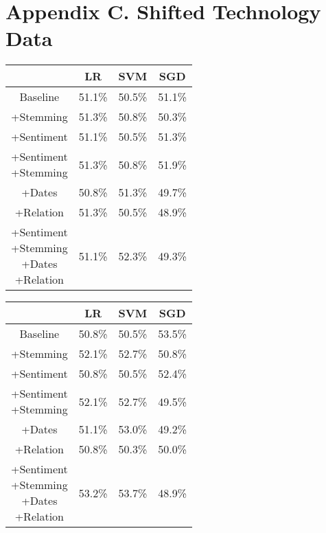 \documentclass[11pt,a4paper]{article}
\begin{document}
\section{Appendix C. Shifted Technology Data}
\begin{center}
\begin{tabular}{ |c|c|c|c| }
 \hline
  & LR & SVM & SGD \\
  \hline
  Baseline & 51.1\% & 50.5\% & 51.1\% \\
  \hline
 +Stemming & 51.3\% & 50.8\% & 50.3\% \\
  \hline
 +Sentiment & 51.1\% & 50.5\% & 51.3\% \\
  \hline
  \shortstack{+Sentiment \\ +Stemming} & 51.3\% & 50.8\% & 51.9\%\\
 \hline
 +Dates & 50.8\% & 51.3\% & 49.7\% \\
  \hline
 +Relation & 51.3\% & 50.5\% & 48.9\% \\
  \hline
  \shortstack{+Sentiment \\ +Stemming \\+Dates \\+Relation} & 51.1\% & 52.3\% & 49.3\% \\
 \hline
\end{tabular}
\end{center}

\begin{center}
\begin{tabular}{ |c|c|c|c| }
 \hline
  & LR & SVM & SGD \\
  \hline
  Baseline & 50.8\% & 50.5\% & 53.5\% \\
  \hline
 +Stemming & 52.1\% & 52.7\% & 50.8\% \\
  \hline
 +Sentiment & 50.8\% & 50.5\% & 52.4\% \\
  \hline
  \shortstack{+Sentiment \\ +Stemming} & 52.1\% & 52.7\% & 49.5\%\\
 \hline
 +Dates & 51.1\% & 53.0\% & 49.2\% \\
  \hline
 +Relation & 50.8\% & 50.3\% & 50.0\% \\
  \hline
  \shortstack{+Sentiment \\ +Stemming \\+Dates \\+Relation} & 53.2\% & 53.7\% & 48.9\% \\
 \hline
\end{tabular}
\end{center}
\end{document}
